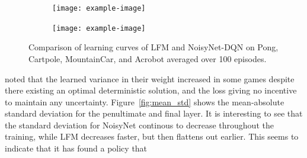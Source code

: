 \documentclass[]{uai2021} %
\begin{document}
\begin{figure}
\begin{subfigure}[b]{0.45\columnwidth}
    \end{subfigure}
    \begin{subfigure}[b]{0.45\columnwidth}
        \centering
        \texttt{[image: example-image]}
    \end{subfigure}
    \begin{subfigure}[b]{0.45\columnwidth}
        \centering
        \texttt{[image: example-image]}
    \end{subfigure}
    \caption{Comparison of learning curves of LFM and NoisyNet-DQN on
    Pong, Cartpole, MountainCar, and Acrobot averaged over 100 episodes.}
    \label{fig:training_curves}
\end{figure}

\cite{fortunato_noisy_2019} noted that the learned variance in their weight increased
in some games despite there existing an optimal deterministic solution, and the loss
giving no incentive to maintain any uncertainty. Figure~\ref{fig:mean_std} shows
the mean-absolute standard deviation for the penultimate and final layer. It is 
interesting to see that the standard deviation for NoisyNet continous to decrease
throughout the training, while LFM decreases faster, but then flattens out earlier.
This seems to indicate that it has found a policy that 
\end{document}
